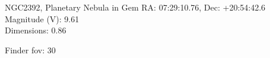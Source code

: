 \begin{block}{NGC2392, Planetary Nebula in Gem}
    RA: 07:29:10.76, Dec: +20:54:42.6 \\ 
    Magnitude (V): 9.61 \\ 
    Dimensions: 0.86 

    Finder fov: 30 
\end{block}
